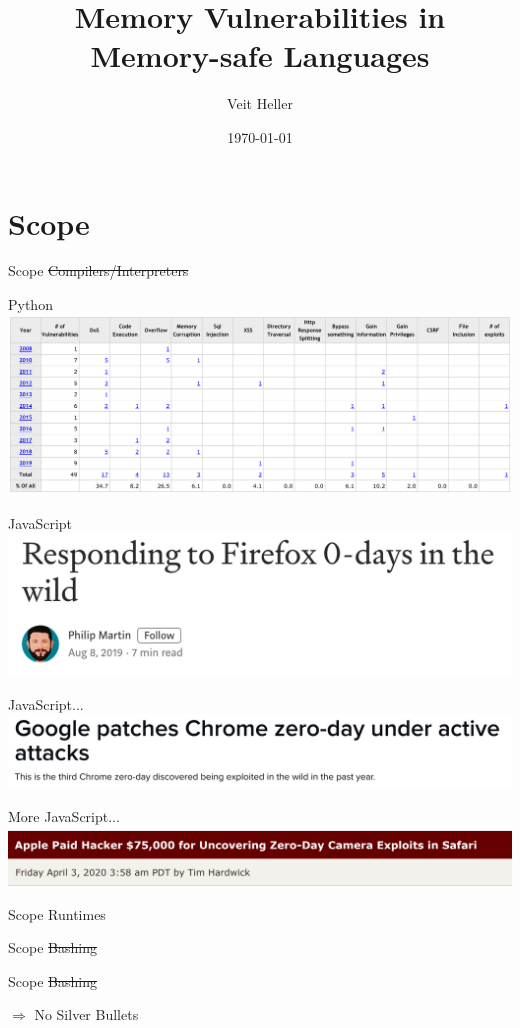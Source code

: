 \documentclass[aspectratio=169,14pt]{beamer}
\title{Memory Vulnerabilities in Memory-safe Languages}
\date{\today}
\author{Veit Heller}
\institute{Information Security Meetup Berlin, August 2020}
\begin{document}
  \maketitle
  \section{Scope}
  \begin{frame}{Scope}
    \sout{Compilers/Interpreters}
  \end{frame}
  \begin{frame}{Python}
    \includegraphics[width=14cm]{python_cves}
  \end{frame}
  \begin{frame}{JavaScript}
    \includegraphics[width=14cm]{js_1}
  \end{frame}
  \begin{frame}{JavaScript...}
    \includegraphics[width=14cm]{js_2}
  \end{frame}
  \begin{frame}{More JavaScript...}
    \includegraphics[width=14cm]{js_3}
  \end{frame}
  \begin{frame}{Scope}
    Runtimes
  \end{frame}
  \begin{frame}{Scope}
    \sout{Bashing}
  \end{frame}
  \begin{frame}{Scope}
    \sout{Bashing}

    $\Rightarrow$ No Silver Bullets
  \end{frame}
\end{document}
